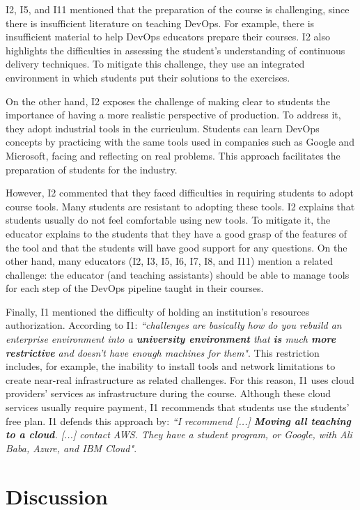 \documentclass[10pt,conference]{IEEEtran}
\begin{document}
I2, I5, and I11 mentioned that the preparation of the course is challenging, since there is insufficient literature on teaching DevOps. For example, there is insufficient material to help DevOps educators prepare their courses. I2 also highlights the difficulties in assessing the student's understanding of continuous delivery techniques. To mitigate this challenge, they use an integrated environment in which students put their solutions to the exercises.

On the other hand, I2 exposes the challenge of making clear to students the importance of having a more realistic perspective of production. To address it, they adopt industrial tools in the curriculum. Students can learn DevOps concepts by practicing with the same tools used in companies such as Google and Microsoft, facing and reflecting on real problems. This approach facilitates the preparation of students for the industry. 

However, I2 commented that they faced difficulties in requiring students to adopt course tools. Many students are resistant to adopting these tools. I2 explains that students usually do not feel comfortable using new tools. To mitigate it, the educator explains to the students that they have a good grasp of the features of the tool and that the students will have good support for any questions. On the other hand, many educators (I2, I3, I5, I6, I7, I8, and I11) mention a related challenge: the educator (and teaching assistants) should be able to manage tools for each step of the DevOps pipeline taught in their courses.


Finally, I1 mentioned the difficulty of holding an institution's resources authorization. According to I1: \textit{``challenges are basically how do you rebuild an enterprise environment into a \textbf{university environment} that \textbf{is} much \textbf{more restrictive} and doesn't have enough machines for them"}. This restriction includes, for example, the inability to install tools and network limitations to create near-real infrastructure as related challenges. For this reason, I1 uses cloud providers' services as infrastructure during the course. Although these cloud services usually require payment, I1 recommends that students use the students' free plan. I1 defends this approach by: \textit{``I recommend [...] \textbf{Moving all teaching to a cloud}. [...] contact AWS. They have a student program, or Google, with Ali Baba, Azure, and IBM Cloud"}.  


\section{Discussion}  \label{sec:discussion}
\end{document}
